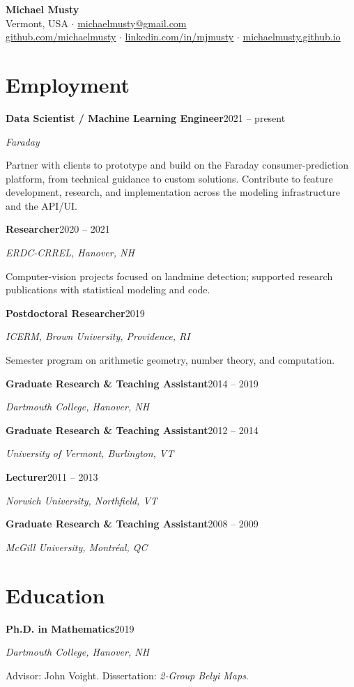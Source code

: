 \documentclass[11pt]{article}
\newcommand{\cventry}[3]{%
  \textbf{#1}\hfill #3\par
  {\itshape #2}\par
}
\begin{document}
\begin{center}
  {\LARGE\bfseries Michael Musty}\\[0.4em]
  Vermont, USA \quad$\cdot$\quad
  \href{mailto:michaelmusty@gmail.com}{michaelmusty@gmail.com}\\[0.2em]
  \href{https://github.com/michaelmusty}{github.com/michaelmusty} \quad$\cdot$\quad
  \href{https://www.linkedin.com/in/mjmusty/}{linkedin.com/in/mjmusty} \quad$\cdot$\quad
  \href{https://michaelmusty.github.io}{michaelmusty.github.io}
\end{center}

\section{Employment}

\cventry{Data Scientist / Machine Learning Engineer}{Faraday}{2021 -- present}
Partner with clients to prototype and build on the Faraday consumer-prediction
platform, from technical guidance to custom solutions. Contribute to feature
development, research, and implementation across the modeling infrastructure and
the API/UI.
\medskip

\cventry{Researcher}{ERDC-CRREL, Hanover, NH}{2020 -- 2021}
Computer-vision projects focused on landmine detection; supported research
publications with statistical modeling and code.
\medskip

\cventry{Postdoctoral Researcher}{ICERM, Brown University, Providence, RI}{2019}
Semester program on arithmetic geometry, number theory, and computation.
\medskip

\cventry{Graduate Research \& Teaching Assistant}{Dartmouth College, Hanover, NH}{2014 -- 2019}
\medskip

\cventry{Graduate Research \& Teaching Assistant}{University of Vermont, Burlington, VT}{2012 -- 2014}
\medskip

\cventry{Lecturer}{Norwich University, Northfield, VT}{2011 -- 2013}
\medskip

\cventry{Graduate Research \& Teaching Assistant}{McGill University, Montr\'eal, QC}{2008 -- 2009}

\section{Education}

\cventry{Ph.D. in Mathematics}{Dartmouth College, Hanover, NH}{2019}
Advisor: John Voight. Dissertation: \textit{2-Group Belyi Maps}.
\medskip
\end{document}
